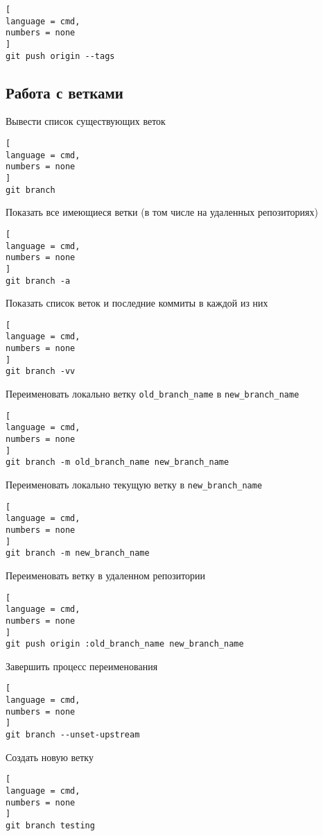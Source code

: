 \documentclass[%
	11pt,
	a4paper,
	utf8,
		]{article}
\begin{document}
\begin{lstlisting}[
language = cmd,
numbers = none
]
git push origin --tags
\end{lstlisting}


\subsection{Работа с ветками}

Вывести список существующих веток

\begin{lstlisting}[
language = cmd,
numbers = none
]
git branch
\end{lstlisting}

Показать все имеющиеся ветки (в том числе на удаленных репозиториях)
\begin{lstlisting}[
language = cmd,
numbers = none
]
git branch -a
\end{lstlisting}

Показать список веток и последние коммиты в каждой из них
\begin{lstlisting}[
language = cmd,
numbers = none
]
git branch -vv
\end{lstlisting}

Переименовать локально ветку \texttt{old\_branch\_name} в \texttt{new\_branch\_name}
\begin{lstlisting}[
language = cmd,
numbers = none
]
git branch -m old_branch_name new_branch_name
\end{lstlisting}

Переименовать локально текущую ветку в \texttt{new\_branch\_name}
\begin{lstlisting}[
language = cmd,
numbers = none
]
git branch -m new_branch_name
\end{lstlisting}

Переименовать ветку в удаленном репозитории
\begin{lstlisting}[
language = cmd,
numbers = none
]
git push origin :old_branch_name new_branch_name
\end{lstlisting}

Завершить процесс переименования
\begin{lstlisting}[
language = cmd,
numbers = none
]
git branch --unset-upstream
\end{lstlisting}


Создать новую ветку

\begin{lstlisting}[
language = cmd,
numbers = none
]
git branch testing
\end{lstlisting}
\end{document}

